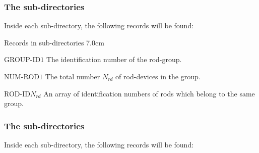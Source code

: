 \subsubsection{The  sub-directories}\label{sect:rodgroup}

\noindent
Inside each  sub-directory, the following records will be found:

\begin{DescriptionEnregistrement}{Records in  sub-directories}
{7.0cm} \label{tabl:tabrodgroup}
 
\IntEnr
{GROUP-ID}{$1$}
{The identification number of the rod-group.}

\IntEnr
{NUM-ROD}{$1$}
{The total number $N_{rd}$ of rod-devices in the group.}

\IntEnr
{ROD-ID}{$N_{rd}$}
{An array of identification numbers of rods which belong to the same group.}

\end{DescriptionEnregistrement}

\subsubsection{The  sub-directories}\label{sect:devicelzc}

\noindent
Inside each  sub-directory, the following records will be found:

